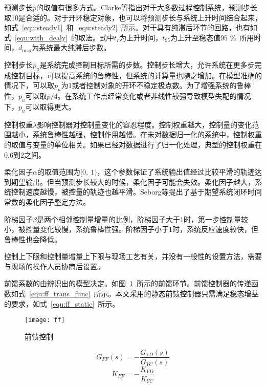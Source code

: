 预测步长$p$的取值有很多方式。Clarke等指出对于大多数过程控制系统，预测步长取10是合适的\cite{clarke1987generalized}。对于开环稳定对象，也可以将预测步长与系统上升时间结合起来，如式~\ref{equ:steady1}~和~\ref{equ:steady2}~所示。对于具有纯滞后环节的回路，也有如式~\ref{equ:with_dealy}~的取法\cite{garriga2010model}。式中$t_{r}$为上升时间，$t_{95}$为上升至稳态值95$\,$$\,$\si{\percent}~所用时间，$d_{\max}$为系统最大纯滞后步数。

 
控制步长$p_{u}$是系统完成控制目标所需的步数。控制步长增大，允许系统在更多步完成控制目标，可以提高系统的鲁棒性，但系统的计算量也随之增加。在模型准确的情况下，可以取$p_{u}$为1或者控制对象的开环不稳定极点数。为了增强系统的鲁棒性，$p_{u}$可以取$p/\textrm{4}$。在系统工作点经常变化或者非线性较强导致模型失配的情况下，$p_{u}$可以取得更大。

控制权重$\lambda$影响控制器对控制量变化的容忍程度。控制权重越大，控制量的变化范围越小，系统鲁棒性越强，控制作用越慢\cite{1991Analysis}。在未对数据归一化的系统中，控制权重的取值与变量的单位相关。如果已经对数据进行了归一化处理，典型的控制权重在0.6到2之间。

柔化因子$\alpha$的取值范围为$[0,\ 1)$，这个参数保证了系统输出值经过比较平滑的轨迹达到期望输出。但当预测步长较大的时候，柔化因子可能会失效。柔化因子越大，系统控制速度越慢，被控量的轨迹也越平滑。Seborg等提出了基于期望系统闭环时间常数的柔化因子整定方法。

阶梯因子$\beta$是两个相邻控制量增量的比例，阶梯因子大于1时，第一步控制量较小，被控量变化较慢，系统鲁棒性强。阶梯因子小于1时，系统反应速度较快，但鲁棒性也会降低\cite{罗国娟2006阶梯式预测控制器的参数整定研究}。

控制上下限和控制量增量上下限与现场工艺有关，并没有一般性的设置方法，需要与现场的操作人员协商后设置。

前馈系数的由辨识出的模型决定。如图~\ref{fig:ff}~所示的前馈环节。前馈控制器的传递函数如式~\ref{equ:ff_trans_func}~所示。本文采用的静态前馈控制器只需满足稳态增益的要求，如式~\ref{equ:ff_static}~所示。
\begin{figure}[!htb]
\centering
\texttt{[image: ff]}
\caption{前馈控制} \label{fig:ff}
\end{figure}
\begin{equation}
\label{equ:ff_trans_func}
G_{FF}{(s)} = -\frac{G_{YD}{(s)}}{G_{YC}{(s)}}
\end{equation}
\begin{equation}
\label{equ:ff_static}
K_{FF} = -\frac{K_{YD}}{K_{YC}}
\end{equation}
 
